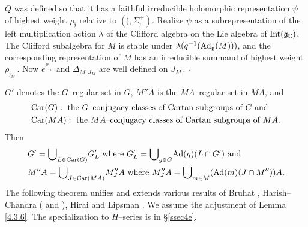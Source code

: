 \documentclass{conm-p-l}
\renewcommand{\gg}{\mathfrak{g}}
\def\gg{\mathfrak{g}}
\def\gj{\mathfrak{j}}
\def\Int{{\rm Int}}
\def\Ad{{\rm Ad}}
\def\Car{{\rm Car}}
\def\C{\mathbb{C}}
\begin{document}
$Q$ was defined so that it has a faithful irreducible holomorphic
representation $\psi$ of highest weight $\rho_\gj$ relative to
$(\gj,\Sigma_\gj^+)$.  Realize $\psi$ as a subrepresentation of the
left multiplication action $\lambda$ of the Clifford algebra on the 
Lie algebra of $\Int(\gg_\C)$.  The Clifford subalgebra for $M$ is
stable under $\lambda(q^{-1}(\Ad_\gg(M)))$, and the corresponding 
representation of $M$ has an irreducible summand of highest weight
$\rho_{\gj_M}$\,.  Now 
$e^{\rho_{\gj_M}}$ and $\Delta_{M,J_M}$ are well defined on $J_M$\,.
\hfill $\square$

$G'$ denotes the $G$--regular set in $G$, $M''A$ is the
$MA$--regular set in $MA$, and 
\begin{equation}\label{car}
\begin{aligned}
&\Car(G): \text{ the $G$--conjugacy classes of Cartan subgroups of $G$ and}\\
&\Car(MA): \text{ the $MA$--conjugacy classes of Cartan subgroups of $MA$}.
\end{aligned}
\end{equation}
Then
\begin{equation}\label{4.3.7}
\begin{aligned}
&G' = {\bigcup}_{L \in \Car(G)} G'_L \text{ where }
	G'_L = {\bigcup}_{g \in G}\Ad(g)(L\cap G') \text{ and }\\
&M''A = {\bigcup}_{J \in \Car(MA)} M''_JA \text{ where }
	M''_JA = {\bigcup}_{m \in M} (\Ad(m)(J\cap M''))A.
\end{aligned}
\end{equation}
The following theorem unifies and extends various results of Bruhat
\cite[Ch. III]{B1956}, Harish--Chandra (\cite[p. 544]{HC1970} and
\cite[\S 11]{HC1971}), Hirai \cite[Theorems 1, 2]{H1968} and Lipsman
\cite[Theorem 9.1]{L1971}.  We assume the adjustment of Lemma \ref{4.3.6}.
The specialization to $H$--series is in \S\ref{ssec4e}.
\end{document}
